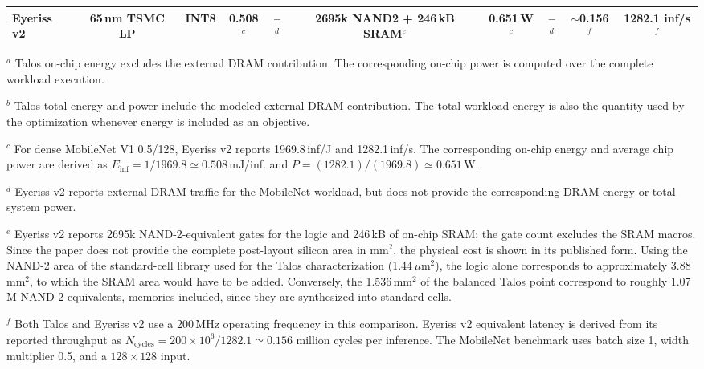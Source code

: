 \begin{table}[t]
{\begin{tabular}{@{}lccccccccc@{}}
Eyeriss v2 \cite{chen2019eyerissv2} &
65\,nm TSMC LP &
INT8 &
0.508$^{c}$ &
--$^{d}$ &
\makecell{2695k NAND2\\+ 246\,kB SRAM$^{e}$} &
0.651\,W$^{c}$ &
--$^{d}$ &
$\sim$0.156$^{f}$ &
1282.1 inf/s$^{f}$ \\

\hline
\end{tabular}%
}

\vspace{1mm}
\begin{minipage}{0.97\textwidth}
\footnotesize

$^{a}$ Talos on-chip energy excludes the external DRAM contribution.
The corresponding on-chip power is computed over the complete workload
execution.

$^{b}$ Talos total energy and power include the modeled external DRAM
contribution. The total workload energy is also the quantity used by
the optimization whenever energy is included as an objective.

$^{c}$ For dense MobileNet V1 0.5/128, Eyeriss v2 reports
1969.8\,inf/J and 1282.1\,inf/s. The corresponding on-chip energy and
average chip power are derived as
$E_{\mathrm{inf}}=1/1969.8\simeq0.508$\,mJ/inf. and
$P=(1282.1)/(1969.8)\simeq0.651$\,W.

$^{d}$ Eyeriss v2 reports external DRAM traffic for the MobileNet
workload, but does not provide the corresponding DRAM energy or total
system power.

$^{e}$ Eyeriss v2 reports 2695k NAND-2-equivalent gates for the
logic and 246\,kB of on-chip SRAM; the gate count excludes the SRAM
macros. Since the paper does not provide the complete post-layout
silicon area in mm$^2$, the physical cost is shown in its published
form. Using the NAND-2 area of the standard-cell library used for the
Talos characterization (1.44\,$\mu$m$^2$), the logic alone corresponds
to approximately 3.88\,mm$^2$, to which the SRAM area would have to be
added. Conversely, the 1.536\,mm$^2$ of the balanced Talos point
correspond to roughly 1.07\,M NAND-2 equivalents, memories included,
since they are synthesized into standard cells.

$^{f}$ Both Talos and Eyeriss v2 use a 200\,MHz operating frequency in
this comparison. Eyeriss v2 equivalent latency is derived from its
reported throughput as
$N_{\mathrm{cycles}}=200\times10^6/1282.1\simeq0.156$ million cycles
per inference. The MobileNet benchmark uses batch size 1, width
multiplier 0.5, and a $128\times128$ input.

\end{minipage}
\end{table}

